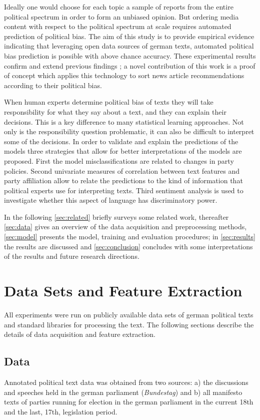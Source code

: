 \documentclass{article}
\begin{document}
Ideally one would choose for each topic a sample of reports from the entire political spectrum in order to form an unbiased opinion. But ordering media content with respect to the political spectrum at scale requires automated prediction of political bias. The aim of this study is to provide empirical evidence  indicating that leveraging open data sources of german texts, automated political bias prediction is possible with above chance accuracy. These experimental results  confirm and extend previous findings \cite{Yu2008, Hirst2014}; a novel contribution of this work is a proof of concept which applies this technology to sort news article recommendations according to their political bias. 

When human experts determine political bias of texts they will take responsibility for what they say about a text, and they can explain their decisions. This is a key difference to many statistical learning approaches. Not only is the responsibility question problematic, it can also be difficult to interpret some of the decisions. In order to validate and explain the predictions of the models three strategies that allow for better interpretations of the models are proposed. First the model misclassifications are related to changes in party policies. Second univariate measures of correlation between text features and party affiliation allow to relate the predictions to the kind of information that political experts use for interpreting texts. Third sentiment analysis is used to investigate whether this aspect of language has discriminatory power. 

In the following \autoref{sec:related} briefly surveys some related work, thereafter \autoref{sec:data} gives an overview of the data acquisition and preprocessing methods, \autoref{sec:model} presents the model, training and evaluation procedures; in \autoref{sec:results} the results are discussed and \autoref{sec:conclusion} concludes with some interpretations of the results and future research directions. 

\section{Data Sets and Feature Extraction}\label{sec:data}
%
All experiments were run on publicly available data sets of german political texts and standard libraries for processing the text. The following sections describe the details of data acquisition and feature extraction. 

\subsection{Data}
Annotated political text data was obtained from two sources: a) the discussions and speeches held in the german parliament ({\em Bundestag}) and b) all manifesto texts of parties running for election in the german parliament in the current 18th and the last, 17th, legislation period.
\end{document}
